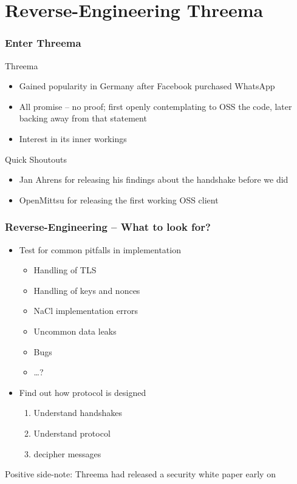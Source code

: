 \documentclass[
	aspectratio=169,
	xetex,
]{beamer}
\begin{document}
\section{Reverse-Engineering Threema}

\begin{frame}
	\frametitle{Enter Threema}
	Threema
	\begin{itemize}
		\item Gained popularity in Germany after Facebook purchased WhatsApp
		\item All promise -- no proof; first openly contemplating to OSS the code, later backing away from that statement
		\item Interest in its inner workings
	\end{itemize}

	Quick Shoutouts
	\begin{itemize}
		\item Jan Ahrens for releasing his findings about the handshake before we did
		\item OpenMittsu for releasing the first working OSS client
	\end{itemize}
	
\end{frame}

\begin{frame}
	\frametitle{Reverse-Engineering -- What to look for?}
\begin{itemize}
	\item Test for common pitfalls in implementation
		\begin{itemize}
			\item Handling of TLS
			\item Handling of keys and nonces
			\item NaCl implementation errors
			\item Uncommon data leaks
			\item Bugs
			\item \ldots?
		\end{itemize}
	\item Find out how protocol is designed
		\begin{enumerate}
			\item Understand handshakes
			\item Understand protocol
			\item decipher messages
		\end{enumerate}
\end{itemize}
\alert{Positive side-note}: Threema had released a security white paper early on
\end{frame}
\end{document}
